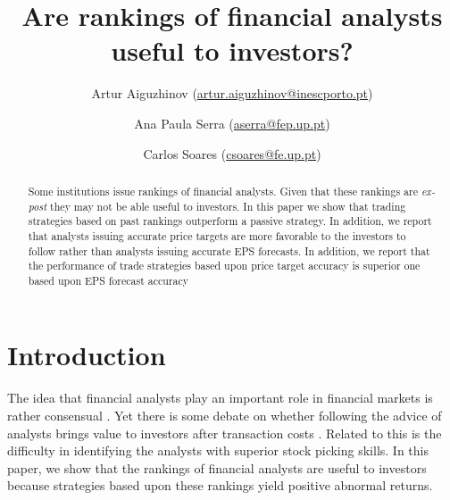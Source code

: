 \documentclass{article}\usepackage[]{graphicx}\usepackage[]{color}
\begin{document}
\title{Are rankings of financial analysts useful to investors?}
 \author[1,2]{ Artur Aiguzhinov (\href{mailto:artur.aiguzhinov@inescporto.pt}{artur.aiguzhinov@inescporto.pt})}
 \author[1]{ Ana Paula Serra (\href{mailto:aserra@fep.up.pt}{aserra@fep.up.pt})}
 \author[2,4]{Carlos Soares (\href{mailto:csoares@fe.up.pt}{csoares@fe.up.pt})}



\maketitle
\thispagestyle{fancy}

\begin{abstract}
Some institutions issue rankings of financial analysts. Given that these rankings are \textit{ex-post} they may not be able useful to investors. In this paper  we show that trading strategies based on past rankings outperform a passive strategy.  In addition, we report that analysts issuing accurate price targets are more favorable to the investors  to follow rather than analysts issuing accurate EPS forecasts. In addition, we report that the performance of trade strategies based upon price target accuracy is superior one  based upon EPS forecast accuracy
\end{abstract}

\section{Introduction}
\label{sec:intro}

The idea that financial analysts play an important role in financial markets is rather consensual \citep{cowles1933csm,obrien1990}. Yet there is some debate on whether following the advice of analysts brings value to investors after transaction costs \citep{womack1996,mikhail2004sae,li2005persistence}. Related to this is the difficulty in identifying the analysts with superior stock picking skills. In this paper, we show that the rankings of financial analysts are useful to investors because strategies based upon these rankings yield positive abnormal returns.
\end{document}
